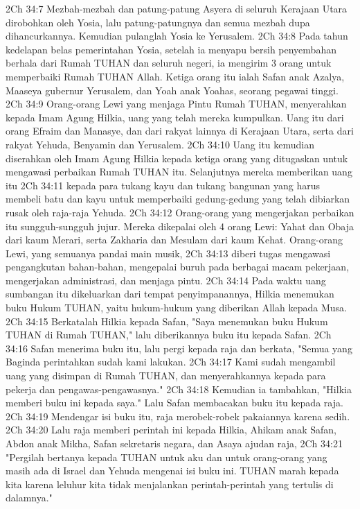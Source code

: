 2Ch 34:7  Mezbah-mezbah dan patung-patung Asyera di seluruh Kerajaan Utara dirobohkan oleh Yosia, lalu patung-patungnya dan semua mezbah dupa dihancurkannya. Kemudian pulanglah Yosia ke Yerusalem.
2Ch 34:8  Pada tahun kedelapan belas pemerintahan Yosia, setelah ia menyapu bersih penyembahan berhala dari Rumah TUHAN dan seluruh negeri, ia mengirim 3 orang untuk memperbaiki Rumah TUHAN Allah. Ketiga orang itu ialah Safan anak Azalya, Maaseya gubernur Yerusalem, dan Yoah anak Yoahas, seorang pegawai tinggi.
2Ch 34:9  Orang-orang Lewi yang menjaga Pintu Rumah TUHAN, menyerahkan kepada Imam Agung Hilkia, uang yang telah mereka kumpulkan. Uang itu dari orang Efraim dan Manasye, dan dari rakyat lainnya di Kerajaan Utara, serta dari rakyat Yehuda, Benyamin dan Yerusalem.
2Ch 34:10  Uang itu kemudian diserahkan oleh Imam Agung Hilkia kepada ketiga orang yang ditugaskan untuk mengawasi perbaikan Rumah TUHAN itu. Selanjutnya mereka memberikan uang itu
2Ch 34:11  kepada para tukang kayu dan tukang bangunan yang harus membeli batu dan kayu untuk memperbaiki gedung-gedung yang telah dibiarkan rusak oleh raja-raja Yehuda.
2Ch 34:12  Orang-orang yang mengerjakan perbaikan itu sungguh-sungguh jujur. Mereka dikepalai oleh 4 orang Lewi: Yahat dan Obaja dari kaum Merari, serta Zakharia dan Mesulam dari kaum Kehat. Orang-orang Lewi, yang semuanya pandai main musik,
2Ch 34:13  diberi tugas mengawasi pengangkutan bahan-bahan, mengepalai buruh pada berbagai macam pekerjaan, mengerjakan administrasi, dan menjaga pintu.
2Ch 34:14  Pada waktu uang sumbangan itu dikeluarkan dari tempat penyimpanannya, Hilkia menemukan buku Hukum TUHAN, yaitu hukum-hukum yang diberikan Allah kepada Musa.
2Ch 34:15  Berkatalah Hilkia kepada Safan, "Saya menemukan buku Hukum TUHAN di Rumah TUHAN," lalu diberikannya buku itu kepada Safan.
2Ch 34:16  Safan menerima buku itu, lalu pergi kepada raja dan berkata, "Semua yang Baginda perintahkan sudah kami lakukan.
2Ch 34:17  Kami sudah mengambil uang yang disimpan di Rumah TUHAN, dan menyerahkannya kepada para pekerja dan pengawas-pengawasnya."
2Ch 34:18  Kemudian ia tambahkan, "Hilkia memberi buku ini kepada saya." Lalu Safan membacakan buku itu kepada raja.
2Ch 34:19  Mendengar isi buku itu, raja merobek-robek pakaiannya karena sedih.
2Ch 34:20  Lalu raja memberi perintah ini kepada Hilkia, Ahikam anak Safan, Abdon anak Mikha, Safan sekretaris negara, dan Asaya ajudan raja,
2Ch 34:21  "Pergilah bertanya kepada TUHAN untuk aku dan untuk orang-orang yang masih ada di Israel dan Yehuda mengenai isi buku ini. TUHAN marah kepada kita karena leluhur kita tidak menjalankan perintah-perintah yang tertulis di dalamnya."
